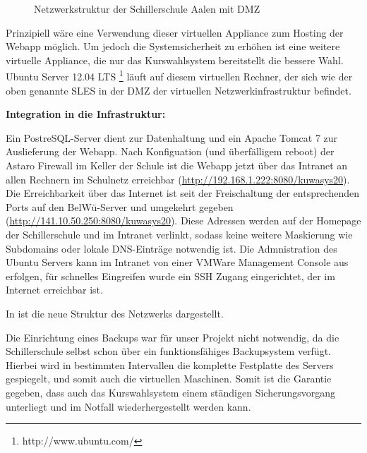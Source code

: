 \documentclass[12pt, twoside, a4paper, ngerman]{article}
\newcommand{\iz}[2]{#1 {\renewcommand{\baselinestretch}{1}\footnote{#2}}} %
\renewcommand{\baselinestretch}{1.5}
\begin{document}
\begin{figure}[H]
\begin{center}
\end{center}
\caption[\textbf{Netzwerkstruktur der Schillerschule Aalen}]{Netzwerkstruktur der Schillerschule Aalen mit DMZ}
\label{fig:Netzwerkstruktur}
\end{figure}

Prinzipiell wäre eine Verwendung dieser virtuellen \gls{Appliance} zum Hosting der \ac{Webapp} möglich. Um jedoch die Systemsicherheit zu erhöhen ist eine weitere virtuelle Appliance, die nur das Kurswahlsystem bereitstellt die bessere Wahl.
\iz{Ubuntu Server 12.04 LTS}{http://www.ubuntu.com/} läuft auf diesem virtuellen Rechner, der sich wie der oben genannte SLES in der \gls{DMZ} der virtuellen Netzwerkinfrastruktur befindet.

\textbf{Integration in die Infrastruktur:}

Ein PostreSQL-Server dient zur Datenhaltung und ein Apache Tomcat 7 zur Auslieferung der \ac{Webapp}. Nach Konfiguation (und überfälligem reboot) der Astaro Firewall im Keller der Schule ist die Webapp jetzt über das Intranet an allen Rechnern im Schulnetz erreichbar (\url{http://192.168.1.222:8080/kuwasys20}). Die Erreichbarkeit über das Internet ist seit der Freischaltung der entsprechenden Ports auf den BelWü-Server und umgekehrt gegeben (\url{http://141.10.50.250:8080/kuwasys20}).
Diese Adressen werden auf der Homepage der Schillerschule und im Intranet verlinkt, sodass keine weitere Maskierung wie Subdomains oder lokale DNS-Einträge notwendig ist.
Die Admnistration des Ubuntu Servers kann im Intranet von einer VMWare Management Console aus erfolgen, für schnelles Eingreifen wurde ein SSH Zugang eingerichtet, der im Internet erreichbar ist.

In  ist die neue Struktur des Netzwerks dargestellt.

Die Einrichtung eines Backups war für unser Projekt nicht notwendig, da die Schillerschule selbst schon über ein funktionsfähiges Backupsystem verfügt. Hierbei wird in bestimmten Intervallen die komplette Festplatte des Servers gespiegelt, und somit auch die virtuellen Maschinen.
Somit ist die Garantie gegeben, dass auch das Kurswahlsystem einem ständigen Sicherungsvorgang unterliegt und im Notfall wiederhergestellt werden kann.
\newpage
\end{document}
